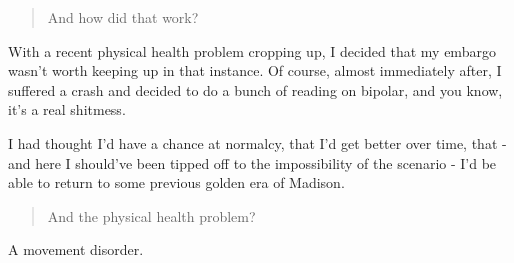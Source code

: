 \begin{quote}
And how did that work?
\end{quote}

With a recent physical health problem cropping up, I decided that my embargo wasn't worth keeping up in that instance. Of course, almost immediately after, I suffered a crash and decided to do a bunch of reading on bipolar, and you know, it's a real shitmess.

I had thought I'd have a chance at normalcy, that I'd get better over time, that - and here I should've been tipped off to the impossibility of the scenario - I'd be able to return to some previous golden era of Madison.

\begin{quote}
And the physical health problem?
\end{quote}

A movement disorder.
